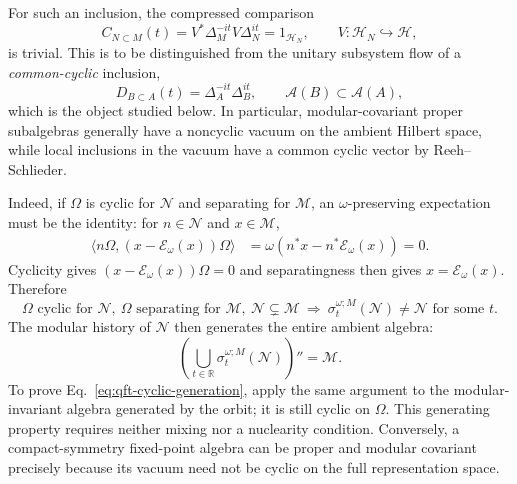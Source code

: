 \documentclass[a4paper,11pt]{article}
\theoremstyle{definition}
\begin{document}
For such an inclusion, the compressed comparison
\begin{equation}
 C_{N\subset M}(t)
  =V^*\Delta_M^{-it}V\Delta_N^{it}=1_{\mathcal H_N},
 \qquad V:\mathcal H_N\hookrightarrow\mathcal H,
 \label{eq:qft-compressed-autonomy}
\end{equation}
is trivial. This is to be distinguished from the unitary subsystem
flow of a \emph{common-cyclic} inclusion,
\begin{equation}
 D_{B\subset A}(t)=\Delta_A^{-it}\Delta_B^{it},
 \qquad \mathcal A(B)\subset\mathcal A(A),
 \label{eq:qft-comparison-reminder}
\end{equation}
which is the object studied below. In particular, modular-covariant
proper subalgebras generally have a noncyclic vacuum on the ambient
Hilbert space, while local inclusions in the vacuum have a common cyclic
vector by Reeh--Schlieder.

Indeed, if $\Omega$ is cyclic for $\mathcal N$ and separating for
$\mathcal M$, an $\omega$-preserving expectation must be the identity:
for $n\in\mathcal N$ and $x\in\mathcal M$,
\begin{align}
 \langle n\Omega,(x-\mathcal E_\omega(x))\Omega\rangle
 &=\omega\!\left(n^*x-n^*\mathcal E_\omega(x)\right)=0 .
\end{align}
Cyclicity gives $(x-\mathcal E_\omega(x))\Omega=0$ and separatingness
then gives $x=\mathcal E_\omega(x)$. Therefore
\begin{equation}
\ \Omega\text{ cyclic for }\mathcal N,
 \ \Omega\text{ separating for }\mathcal M,
 \ \mathcal N\subsetneq\mathcal M
 \ \Longrightarrow\
 \sigma_t^{\omega;M}(\mathcal N)\neq\mathcal N
 \text{ for some }t.\ 
 \label{eq:qft-cyclic-no-go}
\end{equation}
The modular history of $\mathcal N$ then generates the entire ambient
algebra:
\begin{equation}
 \left(\bigcup_{t\in\mathbb R}\sigma_t^{\omega;M}(\mathcal N)
 \right)''=\mathcal M.
 \label{eq:qft-cyclic-generation}
\end{equation}
To prove Eq.~\eqref{eq:qft-cyclic-generation}, apply the same argument
to the modular-invariant algebra generated by the orbit; it is still
cyclic on $\Omega$. This generating property requires neither mixing
nor a nuclearity condition. Conversely, a compact-symmetry fixed-point
algebra can be proper and modular covariant precisely because its
vacuum need not be cyclic on the full representation space.
\end{document}
